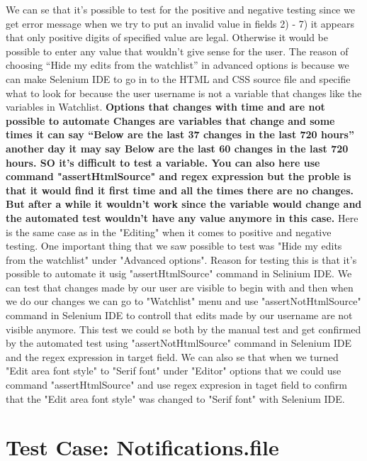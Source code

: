 \documentclass[a4paper,10pt]{article}
\begin{document}
We can se that it’s possible to test for the positive and negative testing since we get error message when we
try to put an invalid value in fields 2) - 7) it appears that only positive digits of specified value are legal. Otherwise
it would be possible to enter any value that wouldn’t give sense for the user. The reason of choosing “Hide my edits from the watchlist” in advanced options is because we can make Selenium IDE to go in to the HTML and CSS source file and specifie what to look for because the user 
username is not a variable that changes like the variables in Watchlist. \textbf{\color{red}Options that changes with time and are not possible to automate
Changes are variables that change and some times it can say “Below are the last 37 changes in the last 720 hours” another day it may say
Below are the last 60 changes in the last 720 hours. SO it’s difficult to test a variable. You can also here use command 
"assertHtmlSource" and regex expression but the proble is that it would find it first time and all the times there are no
changes. But after a while it wouldn't work since the variable would change and the automated test wouldn't have any
value anymore in this case.} 
Here is the same case as in the "Editing" when it comes to positive and negative testing. One important thing that
we saw possible to test was "Hide my edits from the watchlist" under "Advanced options". Reason for testing this is that it's
possible to automate it usig "assertHtmlSource" command in Selinium IDE. We can test that changes made by our user are visible 
to begin with and then when we do our changes we can go to "Watchlist" menu and use "assertNotHtmlSource" command in Selenium IDE
to controll that  edits made by our username are not visible anymore. This test we could se both by the manual test and get
confirmed by the automated test using "assertNotHtmlSource" command in Selenium IDE and the regex expression in target field.
We can also se that when we turned "Edit area font style" to "Serif font" under "Editor" options that we could use command
 "assertHtmlSource" and use regex expresion in taget field to confirm that the "Edit area font style" was changed to "Serif font" 
with Selenium IDE.


\section*{Test Case: Notifications.file}
\end{document}
